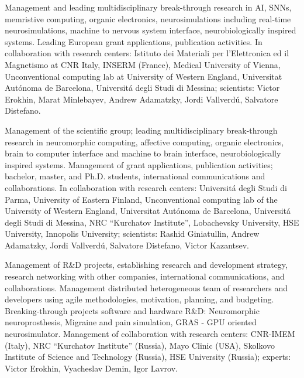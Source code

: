 \documentclass{moderncv}
\begin{document}
            {Management and leading multidisciplinary break-through research in AI, SNNs, memristive computing, organic electronics, neurosimulations including real-time neurosimulations, machine to nervous system interface, neurobiologically inspired systems. Leading European grant applications, publication activities. In collaboration with research centers: Istituto dei Materiali per l'Elettronica ed il Magnetismo at CNR Italy, INSERM (France), Medical University of Vienna, Unconventional computing lab at University of Western England, Universitat Aut\'onoma de Barcelona, Universit\'{a} degli Studi di Messina; scientists: Victor Erokhin, Marat Minlebayev, Andrew Adamatzky, Jordi Vallverd\'{u}, Salvatore Distefano.}
    
    {Management of the scientific group; leading multidisciplinary break-through research in neuromorphic computing, affective computing, organic electronics, brain to computer interface and machine to brain interface, neurobiologically inspired systems. Management of grant applications, publication activities; bachelor, master, and Ph.D. students, international communications and collaborations. In collaboration with research centers: Universit\'{a} degli Studi di Parma, University of Eastern Finland, Unconventional computing lab of the University of Western England, Universitat Aut\'onoma de Barcelona, Universit\'{a} degli Studi di Messina, NRC “Kurchatov Institute”, Lobachevsky University, HSE University, Innopolis University; scientists: Rashid Giniatullin, Andrew Adamatzky, Jordi Vallverd\'{u}, Salvatore Distefano, Victor Kazantsev.}

    {Management of R\&D projects, establishing research and development strategy, research networking with other companies, international communications, and collaborations. Management distributed heterogeneous team of researchers and developers using agile methodologies, motivation, planning, and budgeting. Breaking-through projects software and hardware R\&D: Neuromorphic neuroprosthesis, Migraine and pain simulation, GRAS - GPU oriented neurosimulator. Management of collaboration with research centers: CNR-IMEM (Italy), NRC “Kurchatov Institute” (Russia), Mayo Clinic (USA), Skolkovo Institute of Science and Technology (Russia), HSE University (Russia); experts: Victor Erokhin, Vyacheslav Demin, Igor Lavrov. }
\end{document}
